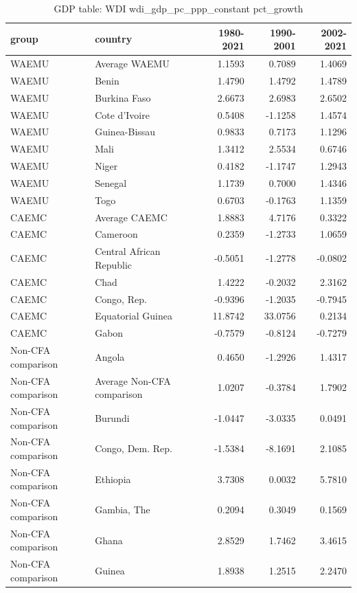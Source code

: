 \begin{table}

\caption{GDP table: WDI wdi_gdp_pc_ppp_constant pct_growth}
\centering
\begin{tabular}[t]{llrrr}
\toprule
group & country & 1980-2021 & 1990-2001 & 2002-2021\\
\midrule
WAEMU & Average WAEMU & 1.1593 & 0.7089 & 1.4069\\
WAEMU & Benin & 1.4790 & 1.4792 & 1.4789\\
WAEMU & Burkina Faso & 2.6673 & 2.6983 & 2.6502\\
WAEMU & Cote d'Ivoire & 0.5408 & -1.1258 & 1.4574\\
WAEMU & Guinea-Bissau & 0.9833 & 0.7173 & 1.1296\\
\addlinespace
WAEMU & Mali & 1.3412 & 2.5534 & 0.6746\\
WAEMU & Niger & 0.4182 & -1.1747 & 1.2943\\
WAEMU & Senegal & 1.1739 & 0.7000 & 1.4346\\
WAEMU & Togo & 0.6703 & -0.1763 & 1.1359\\
CAEMC & Average CAEMC & 1.8883 & 4.7176 & 0.3322\\
\addlinespace
CAEMC & Cameroon & 0.2359 & -1.2733 & 1.0659\\
CAEMC & Central African Republic & -0.5051 & -1.2778 & -0.0802\\
CAEMC & Chad & 1.4222 & -0.2032 & 2.3162\\
CAEMC & Congo, Rep. & -0.9396 & -1.2035 & -0.7945\\
CAEMC & Equatorial Guinea & 11.8742 & 33.0756 & 0.2134\\
\addlinespace
CAEMC & Gabon & -0.7579 & -0.8124 & -0.7279\\
Non-CFA comparison & Angola & 0.4650 & -1.2926 & 1.4317\\
Non-CFA comparison & Average Non-CFA comparison & 1.0207 & -0.3784 & 1.7902\\
Non-CFA comparison & Burundi & -1.0447 & -3.0335 & 0.0491\\
Non-CFA comparison & Congo, Dem. Rep. & -1.5384 & -8.1691 & 2.1085\\
\addlinespace
Non-CFA comparison & Ethiopia & 3.7308 & 0.0032 & 5.7810\\
Non-CFA comparison & Gambia, The & 0.2094 & 0.3049 & 0.1569\\
Non-CFA comparison & Ghana & 2.8529 & 1.7462 & 3.4615\\
Non-CFA comparison & Guinea & 1.8938 & 1.2515 & 2.2470\\

\end{tabular}
\end{table}
